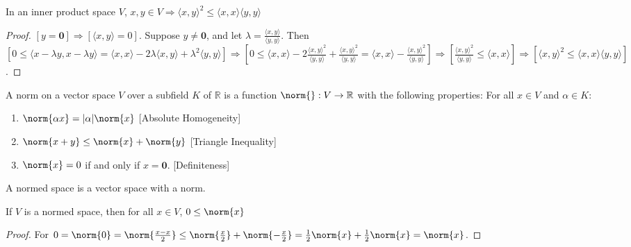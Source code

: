 \documentclass[crop=false,class=article,oneside]{standalone}
\begin{document}
            \begin{theorem}
            In an inner product space $V$, $x,y\in V\Rightarrow \langle x,y \rangle^2 \leq \langle x,x \rangle \langle y,y \rangle$
            \end{theorem}
            \begin{proof}
            $[y=\mathbf{0}]\Rightarrow [\langle x,y\rangle = 0]$. Suppose $y\ne \mathbf{0}$, and let $\lambda = \frac{\langle x,y \rangle}{\langle y,y \rangle}$. Then $[0 \leq \langle x-\lambda y, x-\lambda y\rangle = \langle x,x \rangle - 2\lambda \langle x,y \rangle + \lambda^2 \langle y,y \rangle]\Rightarrow [0\leq \langle x,x \rangle - 2\frac{\langle x,y \rangle ^2 }{\langle y,y \rangle} + \frac{\langle x,y \rangle^2}{\langle y,y \rangle} = \langle x,x \rangle - \frac{\langle x,y \rangle^2}{\langle y,y \rangle}]\Rightarrow [\frac{\langle x,y \rangle ^2}{\langle y,y \rangle} \leq \langle x,x \rangle]\Rightarrow [\langle x,y \rangle^2 \leq \langle x,x \rangle \langle y,y \rangle]$.
            \end{proof}
            \begin{definition}
            A norm on a vector space $V$ over a subfield $K$ of $\mathbb{R}$ is a function $\norm{}:V\rightarrow \mathbb{R}$ with the following properties: For all $x \in V$ and $\alpha \in K$:
            \begin{enumerate}
            \item $\norm{\alpha x} = |\alpha| \norm{x}$ \hfill [Absolute Homogeneity]
            \item $\norm{x+y} \leq \norm{x}+\norm{y}$ \hfill [Triangle Inequality]
            \item $\norm{x} = 0$ if and only if $x = \mathbf{0}$. \hfill [Definiteness]
            \end{enumerate}
            \end{definition}
            \begin{definition}
            A normed space is a vector space with a norm.
            \end{definition}
            \begin{theorem}
            If $V$ is a normed space, then for all $x\in V$, $0\leq \norm{x}$
            \end{theorem}
            \begin{proof}
            For $0=\norm{0} = \norm{\frac{x-x}{2}} \leq \norm{\frac{x}{2}}+\norm{-\frac{x}{2}} = \frac{1}{2}\norm{x} + \frac{1}{2}\norm{x} = \norm{x}$.
            \end{proof}
\end{document}
